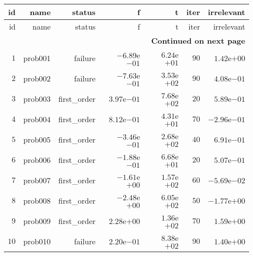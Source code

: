 \documentclass[varwidth=20cm,crop=true]{standalone}
\begin{document}
\begin{longtable}{rrrrrrr}
  \hline
  id & name & status & f & t & iter & irrelevant \\\hline
  \endfirsthead
  \hline
  id & name & status & f & t & iter & irrelevant \\\hline
  \endhead
  \hline
  \multicolumn{7}{r}{{\bfseries Continued on next page}}\\
  \hline
  \endfoot
  \endlastfoot
  \(     1\) & prob001 & failure & \(-6.89\)e\(-01\) & \( 6.24\)e\(+01\) & \(    90\) & \( 1.42\)e\(+00\) \\
  \(     2\) & prob002 & failure & \(-7.63\)e\(-01\) & \( 3.53\)e\(+02\) & \(    90\) & \( 4.08\)e\(-01\) \\
  \(     3\) & prob003 & first\_order & \( 3.97\)e\(-01\) & \( 7.68\)e\(+02\) & \(    20\) & \( 5.89\)e\(-01\) \\
  \(     4\) & prob004 & first\_order & \( 8.12\)e\(-01\) & \( 4.31\)e\(+01\) & \(    70\) & \(-2.96\)e\(-01\) \\
  \(     5\) & prob005 & first\_order & \(-3.46\)e\(-01\) & \( 2.68\)e\(+02\) & \(    40\) & \( 6.91\)e\(-01\) \\
  \(     6\) & prob006 & first\_order & \(-1.88\)e\(-01\) & \( 6.68\)e\(+01\) & \(    20\) & \( 5.07\)e\(-01\) \\
  \(     7\) & prob007 & first\_order & \(-1.61\)e\(+00\) & \( 1.57\)e\(+02\) & \(    60\) & \(-5.69\)e\(-02\) \\
  \(     8\) & prob008 & first\_order & \(-2.48\)e\(+00\) & \( 6.05\)e\(+02\) & \(    50\) & \(-1.77\)e\(+00\) \\
  \(     9\) & prob009 & first\_order & \( 2.28\)e\(+00\) & \( 1.36\)e\(+02\) & \(    70\) & \( 1.59\)e\(+00\) \\
  \(    10\) & prob010 & failure & \( 2.20\)e\(-01\) & \( 8.38\)e\(+02\) & \(    90\) & \( 1.40\)e\(+00\) \\\hline
\end{longtable}
\end{document}
